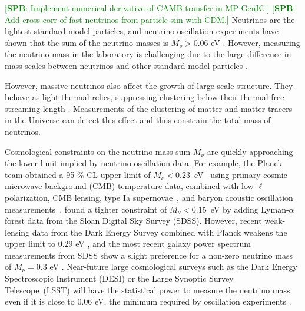 \documentclass[useAMS, usenatbib]{mnras}
\newcommand{\spb}[1]{{\textcolor{green}{[{\bf SPB}: #1]}}}
\begin{document}
\spb{Implement numerical derivative of CAMB transfer in MP-GenIC.}
\spb{Add cross-corr of fast neutrinos from particle sim with CDM.}
Neutrinos are the lightest standard model particles, and neutrino oscillation experiments have shown that the sum of the neutrino masses is $M_\nu > 0.06$ eV \citep{Becker-Szendy_1992, Fukuda_1998}.
However, measuring the neutrino mass in the laboratory is challenging due to the large difference in mass scales between neutrinos and other standard model particles \cite[although see][]{Wolf_2010}.

However, massive neutrinos %
also affect the growth of large-scale structure. They behave as light thermal relics, suppressing clustering below their thermal
free-streaming length \citep[e.g.][]{Lesgourgues_2006, Wong_2011}.
Measurements of the clustering of matter and matter tracers in the Universe can detect this effect and thus constrain the total mass of neutrinos.

Cosmological constraints on the neutrino mass sum $M_\nu$ are quickly approaching the lower limit implied by neutrino oscillation data. For example, the Planck team obtained a 95 \% CL upper limit of $M_\nu<0.23$~eV~\citep{planck2015xiii} using primary cosmic microwave background (CMB) temperature data, combined with low-$\ell$ polarization, CMB lensing, type Ia supernovae~\citep{Betoule_2014}, and baryon acoustic oscillation
measurements~\citep{Beutler_2011, Anderson_2014, Ross_2015}. \cite{Palanque_2015} found a tighter constraint of $M_\nu<0.15$~eV by adding Lyman-$\alpha$ forest data from the Sloan Digital Sky Survey (SDSS). However, recent weak-lensing data from the Dark Energy Survey combined with Planck weakens the upper limit to $0.29$ eV \citep{DES_2017}, and the most recent galaxy power spectrum measurements from SDSS show a slight preference for a non-zero neutrino mass of $M_\nu = 0.3$ eV \citep{Beutler_2014}.
Near-future large cosmological surveys such as the Dark Energy Spectroscopic Instrument (DESI) \citep{DESI} or the
Large Synoptic Survey Telescope~(LSST) \citep{LSST, Joudaki_2012} will have the statistical power to measure the neutrino mass even if it is close to $0.06$ eV, the minimum required by oscillation experiments \citep{Abazajian_2015}.
\end{document}
